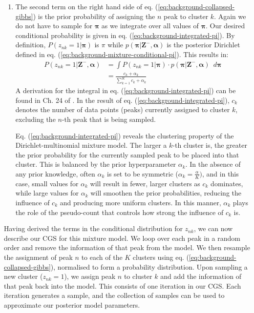\begin{enumerate}
\item The second term on the right hand side of eq. (\ref{eq:background-collapsed-gibbs}) is the prior probability of assigning the $n$ peak to cluster $k$. Again we do not have to sample for $\boldsymbol{\pi}$ as we integrate over all values of $\boldsymbol{\pi}$. Our desired conditional probability is given in eq. (\ref{eq:background-integrated-pi}). By definition, $P(z_{nk}=1 \vert \boldsymbol{\pi})$ is $\pi$ while $p(\boldsymbol{\pi} \vert \boldsymbol{Z}^{-}, \boldsymbol{\alpha})$ is the posterior Dirichlet defined in eq. (\ref{eq:background-mixture-conditional-pi}). This results in:
\begin{equation}
\begin{aligned}
P(z_{nk}=1 \vert \boldsymbol{Z}^{-}, \boldsymbol{\alpha}) &= \int P(z_{nk}=1 \vert \boldsymbol{\pi}) \cdot p(\boldsymbol{\pi} \vert \boldsymbol{Z}^{-}, \boldsymbol{\alpha}) \enspace d\boldsymbol{\pi} \\
                                                                                         &= \frac{c_k + \alpha_k}{\sum_{k=1}^K c_{k} + \alpha_k}
\label{eq:background-integrated-pi}
\end{aligned}
\end{equation}
A derivation for the integral in eq. (\ref{eq:background-integrated-pi}) can be found in Ch. 24 of \cite{murphy2012machine}. In the result of eq. (\ref{eq:background-integrated-pi}), $c_{k}$ denotes the number of data points (peaks) currently assigned to cluster $k$,  excluding the $n$-th peak that is being sampled. 

Eq. (\ref{eq:background-integrated-pi}) reveals the clustering property of the Dirichlet-multinomial mixture model. The larger a $k$-th cluster is, the greater the prior probability for the currently sampled peak to be placed into that cluster. This is balanced by the prior hyperparameter $\alpha_k$. In the absence of any prior knowledge, often $\alpha_k$ is set to be symmetric ($\alpha_k=\frac{\alpha}{K})$, and in this case, small values for $\alpha_k$ will result in fewer, larger clusters as $c_k$ dominates, while large values for $\alpha_k$ will smoothen the prior probabilities, reducing the influence of $c_k$ and producing more uniform clusters. In this manner, $\alpha_k$ plays the role of the pseudo-count that controls how strong the influence of $c_k$ is. 
\end{enumerate}

Having derived the terms in the conditional distribution for $z_{nk}$, we can now describe our CGS for this mixture model. We loop over each peak in a random order and remove the information of that peak from the model. We then resample the assignment of peak $n$ to each of the $K$ clusters using eq. (\ref{eq:background-collapsed-gibbs}), normalised to form a probability distribution. Upon sampling a new cluster ($z_{nk}=1$), we assign peak $n$ to cluster $k$ and add the information of that peak back into the model. This consists of one iteration in our CGS. Each iteration generates a sample, and the collection of samples can be used to approximate our posterior model parameters.

